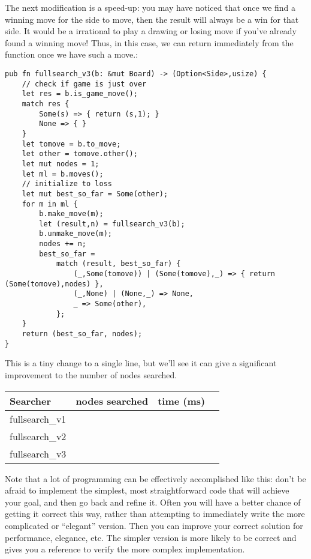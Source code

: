 \documentclass[10pt,dvipdfmx]{report}
\begin{document}
The next modification is a speed-up: you may have noticed that once we find a winning move for the side
to move, then the result will always be a win for that side. It would be a irrational to play a drawing or losing move
if you've already found a winning move!  Thus, in this case, we can return immediately from the function once we have such a
move.:
{\scriptsize\begin{verbatim}
pub fn fullsearch_v3(b: &mut Board) -> (Option<Side>,usize) {
    // check if game is just over
    let res = b.is_game_move();
    match res {
        Some(s) => { return (s,1); }
        None => { }
    }
    let tomove = b.to_move;
    let other = tomove.other();
    let mut nodes = 1;
    let ml = b.moves();
    // initialize to loss
    let mut best_so_far = Some(other);
    for m in ml {
        b.make_move(m);
        let (result,n) = fullsearch_v3(b);
        b.unmake_move(m);
        nodes += n;
        best_so_far =
            match (result, best_so_far) {
                (_,Some(tomove)) | (Some(tomove),_) => { return (Some(tomove),nodes) },
                (_,None) | (None,_) => None,
                _ => Some(other),
            };
    }
    return (best_so_far, nodes);
}
\end{verbatim}
}
This is a tiny change to a single line, but we'll see it can give a significant improvement to
the number of nodes searched.

\begin{center}
\begin{tabular}{ll|rr}
    Searcher       & nodes searched & time (ms) \\\hline
    fullsearch\_v1 &                &           \\
    fullsearch\_v2 &                &           \\
    fullsearch\_v3 &                &           \\
\end{tabular}
\end{center}

Note that a lot of programming can be effectively accomplished like this:
don't be afraid to implement
the simplest, most straightforward code that will achieve your goal, and then
go back and refine it.  Often you will have a better chance of getting it correct
this way, rather than attempting to immediately write the more complicated or
``elegant'' version.  Then you can improve your correct solution for performance,
elegance, etc.  The simpler version is more likely to be correct and gives you
a reference to verify the more complex implementation.
\end{document}
